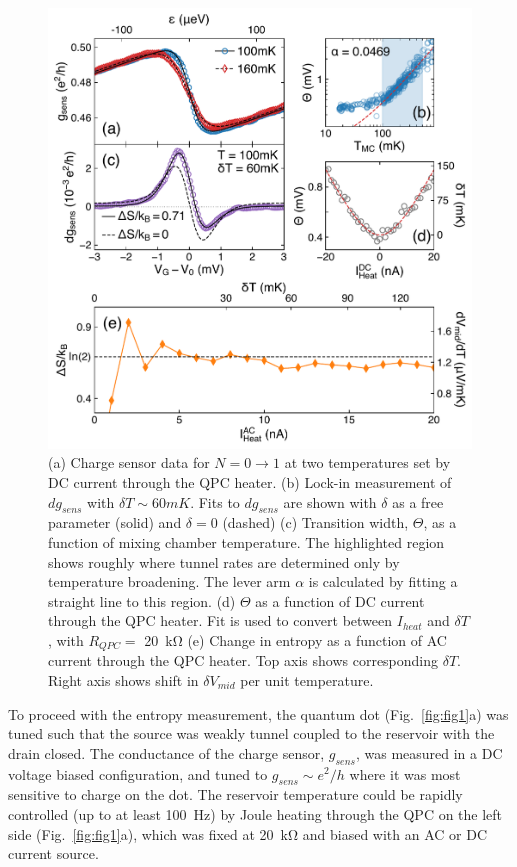 \documentclass[twocolumn,showpacs,preprintnumbers,amsmath,amssymb,pra,aps,superscriptaddress]{revtex4-1}
\begin{document}
\begin{figure}[!]
        \includegraphics[width=1.0\columnwidth]{../figures/figure_2.pdf}
        \caption{\label{fig:fig2}(a) Charge sensor data for $N=0 \rightarrow 1$ at two temperatures set by DC current through the QPC heater. (b) Lock-in measurement of $dg_{sens}$ with $\delta T \sim 60mK$. Fits to $dg_{sens}$ are shown with $\delta$ as a free parameter (solid) and $\delta=0$ (dashed) (c) Transition width, $\Theta$, as a function of mixing chamber temperature. The highlighted region shows roughly where tunnel rates are determined only by temperature broadening. The lever arm $\alpha$ is calculated by fitting a straight line to this region. (d) $\Theta$ as a function of DC current through the QPC heater. Fit is used to convert between $I_{heat}$ and $\delta T$, with $R_{QPC} = $ \SI{20}{\kilo\ohm} (e) Change in entropy as a function of AC current through the QPC heater. Top axis shows corresponding $\delta T$. Right axis shows shift in $\delta V_{mid}$ per unit temperature.}
\end{figure}

To proceed with the entropy measurement, the quantum dot (Fig.~\ref{fig:fig1}a) was tuned such that the source was weakly tunnel coupled to the reservoir with the drain closed. The conductance of the charge sensor, $g_{sens}$, was measured in a DC voltage biased configuration, and tuned to $g_{sens}{\sim}e^2/h$ where it was most sensitive to charge on the dot.  The reservoir temperature could be rapidly controlled (up to at least \SI{100}{\hertz}) by Joule heating through the QPC on the left side (Fig.~\ref{fig:fig1}a), which was fixed at \SI{20}{\kilo\ohm} and biased with an AC or DC current source.
\end{document}
